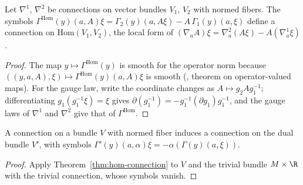 \begin{theorem}
  \label{thm:hom-connection}
  \leanok
  Let $\nabla^1$, $\nabla^2$ be connections on vector bundles $V_1$, $V_2$ with normed fibers.
  The symbols $\Gamma^{\mathrm{Hom}}(y)(a, A)\xi = \Gamma_2(y)(a, A\xi) - A\,\Gamma_1(y)(a, \xi)$
  define a connection on $\mathrm{Hom}(V_1, V_2)$, the local form of
  $(\nabla_a A)\xi = \nabla^2_a(A\xi) - A(\nabla^1_a \xi)$.
\end{theorem}

\begin{proof}
  \leanok
  The map $y \mapsto \Gamma^{\mathrm{Hom}}(y)$ is smooth for the operator norm because
  $((y, a, A), \xi) \mapsto \Gamma^{\mathrm{Hom}}(y)(a, A)\xi$ is smooth (\cite{LCA}, theorem on
  operator-valued maps). For the gauge law, write the coordinate changes as
  $A \mapsto g_2 A g_1^{-1}$; differentiating $g_1(g_1^{-1}\xi) = \xi$ gives
  $\partial(g_1^{-1}) = -g_1^{-1}(\partial g_1)g_1^{-1}$, and the gauge laws of $\nabla^1$ and
  $\nabla^2$ give that of $\Gamma^{\mathrm{Hom}}$.
\end{proof}

\begin{corollary}
  \label{cor:dual-connection}
  \leanok
  A connection on a bundle $V$ with normed fiber induces a connection on the dual bundle $V'$,
  with symbols $\Gamma'(y)(a, \alpha)\xi = -\alpha(\Gamma(y)(a, \xi))$.
\end{corollary}

\begin{proof}
  \leanok
  Apply Theorem~\ref{thm:hom-connection} to $V$ and the trivial bundle $M \times \R$ with the
  trivial connection, whose symbols vanish.
\end{proof}

